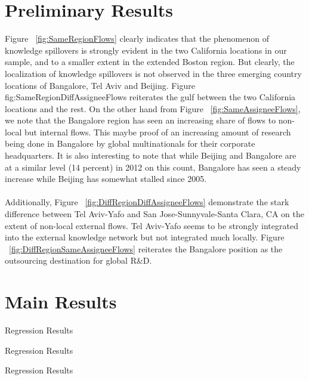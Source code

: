 \documentclass[12pt]{article}
\begin{document}
\section{Preliminary Results}
Figure ~\ref{fig:SameRegionFlows} clearly indicates that the phenomenon of knowledge spillovers is strongly evident in the two California locations in our sample, and to a smaller extent in the extended Boston region. But clearly, the localization of knowledge spillovers is not observed in the three emerging country locations of Bangalore, Tel Aviv and Beijing. Figure {fig:SameRegionDiffAssigneeFlows} reiterates the gulf between the two California locations and the rest. On the other hand from Figure ~\ref{fig:SameAssigneeFlows}, we note that the Bangalore region has seen an increasing share of flows to non-local but internal flows. This maybe proof of an increasing amount of research being done in Bangalore by global multinationals for their corporate headquarters. It is also interesting to note that while Beijing and Bangalore are at a similar level (14 percent) in 2012 on this count, Bangalore has seen a steady increase while Beijing has somewhat stalled since 2005.
\\\\
Additionally, Figure ~\ref{fig:DiffRegionDiffAssigneeFlows} demonstrate the stark difference between Tel Aviv-Yafo and San Jose-Sunnyvale-Santa Clara, CA on the extent of non-local external flows. Tel Aviv-Yafo seems to be strongly integrated into the external knowledge network but not integrated much locally. Figure ~\ref{fig:DiffRegionSameAssigneeFlows} reiterates the Bangalore position as the outsourcing destination for global R\&D.
\newpage
\section{Main Results}

\begin{table}
\caption{Regression Results}

\end{table}

\begin{table}
\caption{Regression Results}

\end{table}

\begin{table}
\caption{Regression Results}


\end{table}
\end{document}
